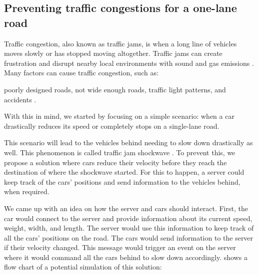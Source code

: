 \subsection{Preventing traffic congestions for a one-lane road}\label{sec:traffic_congestion}

Traffic congestion, also known as traffic jams, is when a long line of vehicles moves slowly or has stopped moving altogether. Traffic jams can create frustration and disrupt nearby local environments with sound and gas emissions \parencite{traffic_congestion_pollution}. Many factors can cause traffic congestion, such as:

poorly designed roads, not wide enough roads, traffic light patterns, and accidents \parencite{traffic_congestion}.

With this in mind, we started by focusing on a simple scenario: when a car drastically reduces its speed or completely stops on a single-lane road.

This scenario will lead to the vehicles behind needing to slow down drastically as well. This phenomenon is called traffic jam shockwave \parencite{traffic_shockwave}. To prevent this, we propose a solution where cars reduce their velocity before they reach the destination of where the shockwave started. For this to happen, a server could keep track of the cars' positions and send information to the vehicles behind, when required. 

We came up with an idea on how the server and cars should interact. First, the car would connect to the server and provide information about its current speed, weight, width, and length. The server would use this information to keep track of all the cars' positions on the road. The cars would send information to the server if their velocity changed. This message would trigger an event on the server where it would command all the cars behind to slow down accordingly.  shows a flow chart of a potential simulation of this solution:

